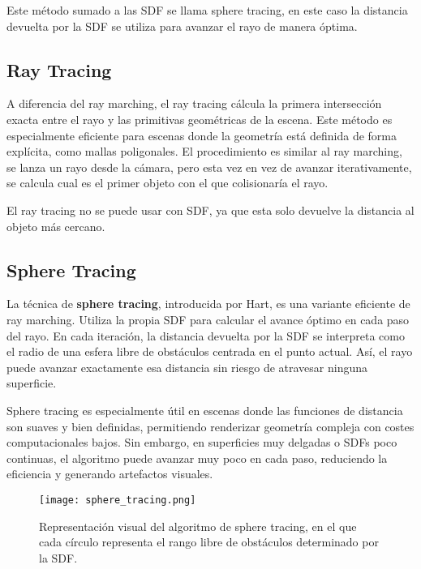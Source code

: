 Este método sumado a las SDF se llama sphere tracing, en este caso la distancia
devuelta por la SDF se utiliza para avanzar el rayo de manera óptima.

\subsection{Ray Tracing}

A diferencia del ray marching, el ray tracing cálcula la primera intersección
exacta entre el rayo y las primitivas geométricas de la
escena\cite{whitted1980}. Este método es especialmente eficiente para escenas
donde la geometría está definida de forma explícita, como mallas poligonales.
El procedimiento es similar al ray marching, se lanza un rayo desde la cámara,
pero esta vez en vez de avanzar iterativamente, se calcula cual es el primer
objeto con el que colisionaría el rayo.

El ray tracing no se puede usar con SDF, ya que esta solo devuelve la distancia
al objeto más cercano.

\subsection{Sphere Tracing}

La técnica de \textbf{sphere tracing}, introducida por Hart\cite{hart1996}, es
una variante eficiente de ray marching. Utiliza la propia SDF para calcular el
avance óptimo en cada paso del rayo. En cada iteración, la distancia devuelta
por la SDF se interpreta como el radio de una esfera libre de obstáculos
centrada en el punto actual. Así, el rayo puede avanzar exactamente esa
distancia sin riesgo de atravesar ninguna superficie.

Sphere tracing es especialmente útil en escenas donde las funciones de
distancia son suaves y bien definidas, permitiendo renderizar geometría
compleja con costes computacionales bajos. Sin embargo, en superficies muy
delgadas o SDFs poco continuas, el algoritmo puede avanzar muy poco en cada
paso, reduciendo la eficiencia y generando artefactos visuales.

\begin{figure}[H]
    \centering
    \texttt{[image: sphere\_tracing.png]}
    \caption{Representación visual del algoritmo de sphere tracing, en el que cada círculo representa el rango libre de obstáculos determinado por la SDF.}
    \label{fig:sphere-tracing}
\end{figure}

